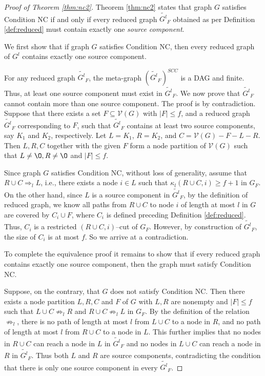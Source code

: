 \documentclass[letterpaper, 11pt]{article}
\newcommand{\calV}{{\mathcal{V}}}
\begin{document}
\begin{proof}[Proof of Theorem \ref{thm:nc2}]
Theorem \ref{thm:nc2} states that graph $G$ satisfies Condition NC if and only if every reduced graph $\widetilde{G^l}_F$ obtained as per Definition \ref{def:reduced}
must contain exactly one {\em source component}.


We first show that if graph $G$ satisfies Condition NC, then every reduced graph of $G^l$ contains exactly one source component.

 For any reduced graph $\widetilde{G^l}_F$, the meta-graph $(\widetilde{G^l}_F)^{SCC}$ is a DAG and finite. Thus, at least one source component must exist in $\widetilde{G^l}_F$.
 We now prove that $\widetilde{G^l}_F$ cannot
contain more than one source component. The proof is by contradiction.
Suppose that there exists a set $F\subseteq \calV(G)$ with $|F|\leq f$, and a reduced graph
$\widetilde{G^l}_F$ corresponding to $F$, such
that $\widetilde{G^l}_F$ contains at least two source components, say $K_1$ and $K_2$, respectively.
Let $L=K_1$, $R=K_2$, and $C=\calV(G)-F-L-R$. Then $L, R, C$ together with the given $F$ form a node partition of $\calV(G)$ such that $L\not=\O, R\not=\O$ and $|F|\le f$.

Since graph $G$ satisfies Condition NC, without loss of generality, assume that $R\cup C \Rightarrow_l L$, i.e., there exists a node $i\in L$ such that $\kappa_l(R\cup C, i)\ge f+1$ in $G_F$.
On the other hand,
since $L$ is a source component in $\widetilde{G^l}_F$, by the definition of reduced graph, we know all paths from $R\cup C$ to node $i$ of length at most $l$ in $G$ are covered by $C_i\cup F$, where $C_i$ is defined preceding Definition \ref{def:reduced}.
Thus, $C_i$ is a restricted $(R\cup C, i)$--cut of $G_F$. However, by construction of $\widetilde{G^l}_F$, the size of $C_i$ is at most $f$. So we arrive at a contradiction.

To complete the equivalence proof it remains to show that if every reduced graph contains exactly one source component, then the graph must satisfy Condition NC.

Suppose, on the contrary, that $G$ does not satisfy Condition NC. Then there exists a node partition $L, R, C$ and $F$ of $G$ with $L, R$ are nonempty and $|F|\le f$ such that $L\cup C\not\Rightarrow_l R$ and $R\cup C\not\Rightarrow_l L$ in $G_F$. By the definition of the relation $\not\Rightarrow_l$, there is no path of length at most $l$ from $L\cup C$ to a node in $R$, and no path of length at most $l$ from $R\cup C$ to a node in $L$. This further implies that no nodes in $R\cup C$ can reach a node in $L$ in $\widetilde{G^l}_F$ and no nodes in $L\cup C$ can reach a node in $R$ in $\widetilde{G^l}_F$. Thus both $L$ and $R$ are source components, contradicting the condition that there is only one source component in every $\widetilde{G^l}_F$.

\end{proof}
\end{document}
